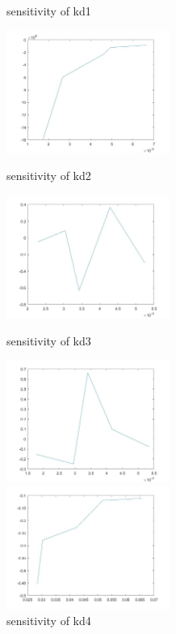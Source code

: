 \begin{figure}
\begin{varwidth}[t]{\textwidth}
	\end{varwidth}
	\caption{sensitivity of kd1}
	\begin{varwidth}[t]{\textwidth}
		\vspace{0pt}
		\includegraphics[height=4cm]{sd2.jpg}
	\end{varwidth}
	\caption{sensitivity of kd2}
	\begin{varwidth}[t]{\textwidth}
		\vspace{0pt}
		\includegraphics[height=4cm]{sd3.jpg}
	\end{varwidth}
	\caption{sensitivity of kd3}
	\begin{varwidth}[t]{\textwidth}
		\vspace{0pt}
		\includegraphics[height=4cm]{sd4.jpg}
	\end{varwidth}
	\caption{sensitivity of kd4}
	\begin{varwidth}[t]{\textwidth}
		\vspace{0pt}
		\includegraphics[height=4cm]{sd5.jpg}

\end{varwidth}
\end{figure}
